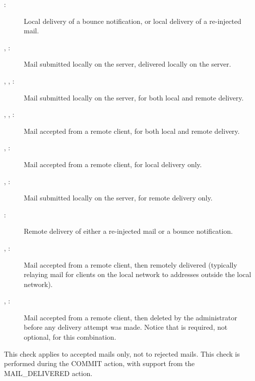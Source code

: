 \begin{description}

    \item [:] Local delivery of a bounce notification, or
        local delivery of a re-injected mail.

    \item [, :] Mail submitted locally on the
        server, delivered locally on the server.

    \item [, , :] Mail submitted
        locally \newline{} on the server, for both local and remote
        delivery.

    \item [, , :] Mail accepted
        from a remote client, for both local and remote delivery.

    \item [, :] Mail accepted from a remote
        client, for local delivery only.

    \item [, :] Mail submitted locally on the
        server, for remote delivery only.

    \item [:] Remote delivery of either a re-injected mail or
        a bounce notification.

    \item [, :] Mail accepted from a remote
        client, then remotely delivered (typically relaying mail for
        clients on the local network to addresses outside the local
        network).

    \item [, :] Mail accepted from a remote
        client, then deleted by the administrator before any delivery
        attempt was made.  Notice that  is required, not
        optional, for this combination.

\end{description}

This check applies to accepted mails only, not to rejected mails.  This
check is performed during the COMMIT action, with support from the
MAIL\_DELIVERED action.

